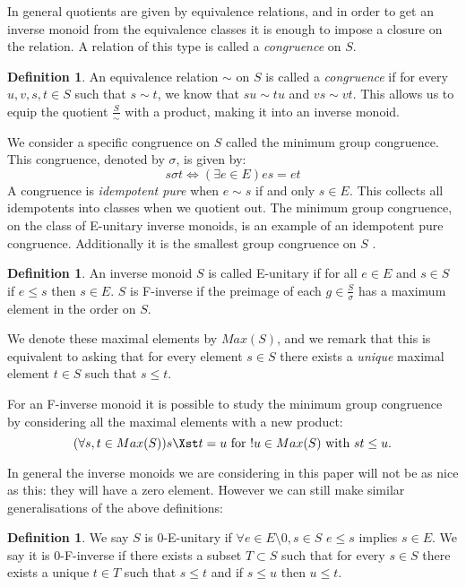 \documentclass[11pt,]{amsbook}
\theoremstyle{plain}
\theoremstyle{definition}%
\newtheorem{definition}[theorem]{Definition}%
\theoremstyle{remark}%
\begin{document}
In general quotients are given by equivalence relations, and in order to get an inverse monoid from the equivalence classes it is enough to impose a closure on the relation. A relation of this type is called a \textit{congruence} on $S$.

\begin{definition}
An equivalence relation $\sim$ on $S$ is called a \textit{congruence} if for every $u,v,s,t \in S$ such that $s \sim t$, we know that $su\sim tu$ and $vs \sim vt$. This allows us to equip the quotient $\frac{S}{\sim}$ with a product, making it into an inverse monoid.
\end{definition}

We consider a specific congruence on $S$ called the minimum group congruence.  This congruence, denoted by $\sigma$, is given by:
\begin{equation*}
s \sigma t \Leftrightarrow (\exists e \in E) es = et
\end{equation*}
A congruence is \textit{idempotent pure} when $e \sim s$ if and only $s \in E$. This collects all idempotents into classes when we quotient out. The minimum group congruence, on the class of E-unitary inverse monoids, is an example of an idempotent pure congruence. Additionally it is the smallest group congruence on $S$ \cite{MR1694900}.
\begin{definition}
An inverse monoid $S$ is called E-unitary if for all $e \in E$ and $s \in S$ if $e \leq s$ then $s \in E$. $S$ is F-inverse if the preimage of each $g \in \frac{S}{\sigma}$ has a maximum element in the order on $S$.
\end{definition}

We denote these maximal elements by $Max(S)$, and we remark that this is equivalent to asking that for every element $s \in S$ there exists a \textit{unique} maximal element $t \in S$ such that $s \leq t$.

For an F-inverse monoid it is possible to study the minimum group congruence by considering all the maximal elements with a new product:
\begin{equation*}
(\forall s,t \in Max(S)) s \Xst t = u \mbox{ for } !u \in Max(S) \mbox{ with } st \leq u.
\end{equation*}

In general the inverse monoids we are considering in this paper will not be as nice as this: they will have a zero element. However we can still make similar generalisations of the above definitions:

\begin{definition}
We say $S$ is 0-E-unitary if $\forall e \in E\setminus 0, s \in S$ $e \leq s$ implies $s \in E$. We say it is 0-F-inverse if there exists a subset $T \subset S$ such that for every $s \in S$ there exists a unique $t \in T$ such that $s \leq t$ and if $s \leq u$ then $u \leq t$.
\end{definition}
\end{document}
